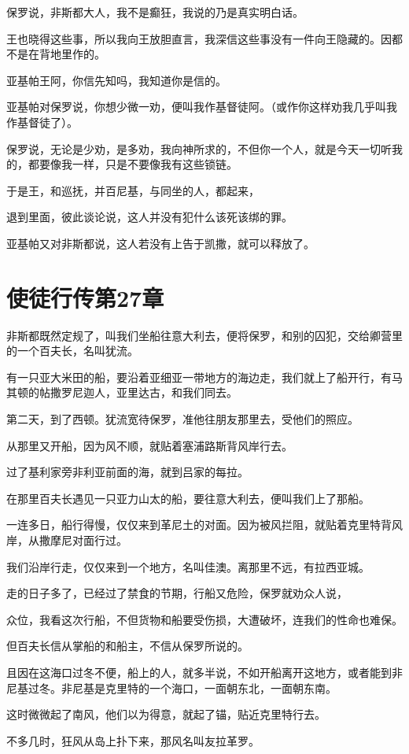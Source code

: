 \documentclass[12pt,oneside]{book}
\begin{document}
保罗说，非斯都大人，我不是癫狂，我说的乃是真实明白话。

王也晓得这些事，所以我向王放胆直言，我深信这些事没有一件向王隐藏的。因都不是在背地里作的。

亚基帕王阿，你信先知吗，我知道你是信的。

亚基帕对保罗说，你想少微一劝，便叫我作基督徒阿。（或作你这样劝我几乎叫我作基督徒了）。

保罗说，无论是少劝，是多劝，我向神所求的，不但你一个人，就是今天一切听我的，都要像我一样，只是不要像我有这些锁链。

于是王，和巡抚，并百尼基，与同坐的人，都起来，

退到里面，彼此谈论说，这人并没有犯什么该死该绑的罪。

亚基帕又对非斯都说，这人若没有上告于凯撒，就可以释放了。

\chapter{使徒行传第27章}
非斯都既然定规了，叫我们坐船往意大利去，便将保罗，和别的囚犯，交给卿营里的一个百夫长，名叫犹流。

有一只亚大米田的船，要沿着亚细亚一带地方的海边走，我们就上了船开行，有马其顿的帖撒罗尼迦人，亚里达古，和我们同去。

第二天，到了西顿。犹流宽待保罗，准他往朋友那里去，受他们的照应。

从那里又开船，因为风不顺，就贴着塞浦路斯背风岸行去。

过了基利家旁非利亚前面的海，就到吕家的每拉。

在那里百夫长遇见一只亚力山太的船，要往意大利去，便叫我们上了那船。

一连多日，船行得慢，仅仅来到革尼土的对面。因为被风拦阻，就贴着克里特背风岸，从撒摩尼对面行过。

我们沿岸行走，仅仅来到一个地方，名叫佳澳。离那里不远，有拉西亚城。

走的日子多了，已经过了禁食的节期，行船又危险，保罗就劝众人说，

众位，我看这次行船，不但货物和船要受伤损，大遭破坏，连我们的性命也难保。

但百夫长信从掌船的和船主，不信从保罗所说的。

且因在这海口过冬不便，船上的人，就多半说，不如开船离开这地方，或者能到非尼基过冬。非尼基是克里特的一个海口，一面朝东北，一面朝东南。

这时微微起了南风，他们以为得意，就起了锚，贴近克里特行去。

不多几时，狂风从岛上扑下来，那风名叫友拉革罗。
\end{document}
